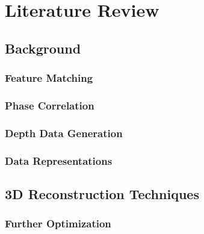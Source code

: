 
\makeatletter
\chapter{Literature Review}
\label{ch:TheLiteratureReviewChapter}
\section{Background}

\subsection{Feature Matching}


\subsection{Phase Correlation}
\label{Sec:SuperficialPCSection}


\subsection{Depth Data Generation}
\label{DepthDataGenSection}



\subsection{Data Representations}


\section{3D Reconstruction Techniques}

\subsection{Further Optimization}


